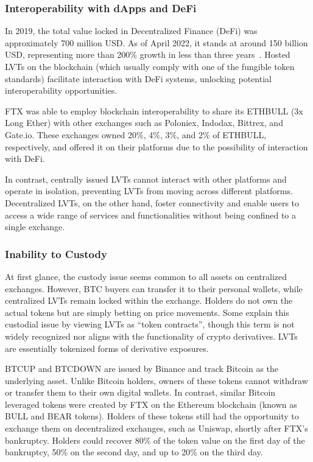\subsubsection{Interoperability with dApps and DeFi}
In 2019, the total value locked in Decentralized Finance (DeFi) was approximately 700 million USD. As of April 2022, it stands at around 150 billion USD, representing more than 200\% growth in less than three years~\cite{werner2022sok}. Hosted LVTs on the blockchain (which usually comply with one of the fungible token standards) facilitate interaction with DeFi systems, unlocking potential interoperability opportunities. 
\begin{example}
	FTX was able to employ blockchain interoperability to share its ETHBULL (3x Long Ether) with other exchanges such as Poloniex, Indodax, Bittrex, and Gate.io. These exchanges owned 20\%, 4\%, 3\%, and 2\% of ETHBULL, respectively, and offered it on their platforms due to the possibility of interaction with DeFi.
\end{example}
In contrast, centrally issued LVTs cannot interact with other platforms and operate in isolation, preventing LVTs from moving across different platforms. Decentralized LVTs, on the other hand, foster connectivity and enable users to access a wide range of services and functionalities without being confined to a single exchange.

\subsubsection{Inability to Custody}
At first glance, the custody issue seems common to all assets on centralized exchanges. However, BTC buyers can transfer it to their personal wallets, while centralized LVTs remain locked within the exchange. Holders do not own the actual tokens but are simply betting on price movements. Some explain this custodial issue by viewing LVTs as ``token contracts'', though this term is not widely recognized nor aligns with the functionality of crypto derivatives. LVTs are essentially tokenized forms of derivative exposures.
\begin{example}
	BTCUP and BTCDOWN are issued by Binance and track Bitcoin as the underlying asset. Unlike Bitcoin holders, owners of these tokens cannot withdraw or transfer them to their own digital wallets. In contrast, similar Bitcoin leveraged tokens were created by FTX on the Ethereum blockchain (known as BULL and BEAR tokens). Holders of these tokens still had the opportunity to exchange them on decentralized exchanges, such as Uniswap, shortly after FTX's bankruptcy. Holders could recover 80\% of the token value on the first day of the bankruptcy, 50\% on the second day, and up to 20\% on the third day.
\end{example}

